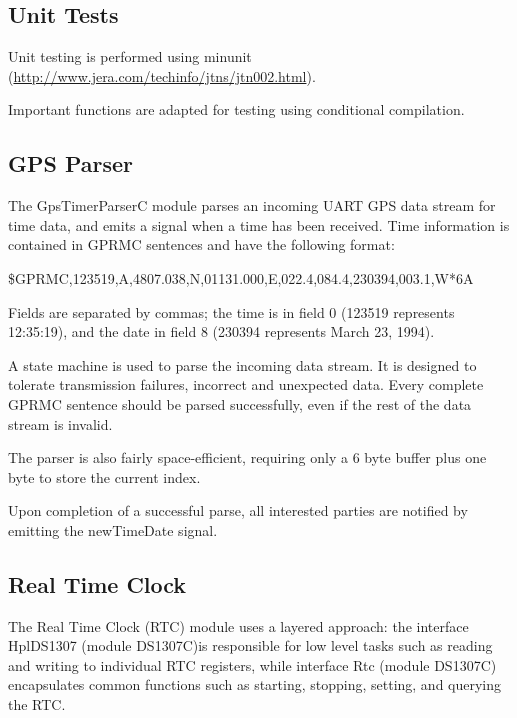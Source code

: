 \documentclass[12pt,a4paper,titlepage,oneside]{article}
\begin{document}
\subsection{Unit Tests}

Unit testing is performed using minunit
(\url{http://www.jera.com/techinfo/jtns/jtn002.html}).

Important functions are adapted for testing using conditional compilation.

\subsection{GPS Parser}

The GpsTimerParserC module parses an incoming UART GPS data stream for time
data, and emits a signal when a time has been received. Time information is
contained in GPRMC sentences and have the following format:

\$GPRMC,123519,A,4807.038,N,01131.000,E,022.4,084.4,230394,003.1,W*6A

Fields are separated by commas; the time is in field 0 (123519 represents
12:35:19), and the date in field 8 (230394 represents March 23, 1994).

A state machine is used to parse the incoming data stream. It is designed to
tolerate transmission failures, incorrect and unexpected data. Every complete
GPRMC sentence should be parsed successfully, even if the rest of the data
stream is invalid.

The parser is also fairly space-efficient, requiring only a 6 byte buffer plus
one byte to store the current index.

Upon completion of a successful parse, all interested parties are notified by
emitting the newTimeDate signal.

\subsection{Real Time Clock}

The Real Time Clock (RTC) module uses a layered approach: the interface
HplDS1307 (module DS1307C)is responsible for low level tasks such as reading
and writing to individual RTC registers, while interface Rtc (module DS1307C)
encapsulates common functions such as starting, stopping, setting, and querying
the RTC.
\end{document}
